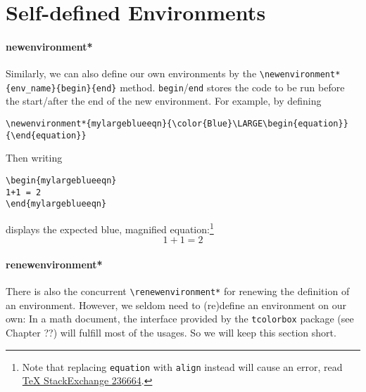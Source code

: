 \section{Self-defined Environments}

\paragraph{newenvironment*} Similarly, we can also define our own environments by the \texttt{\textbackslash newenvironment*\{env\_name\}\{begin\}\{end\}} method. \texttt{begin}/\texttt{end} stores the code to be run before the start/after the end of the new environment. For example, by defining
\begin{lstlisting}
\newenvironment*{mylargeblueeqn}{\color{Blue}\LARGE\begin{equation}}{\end{equation}}   
\end{lstlisting}
\newenvironment*{mylargeblueeqn}{\color{Blue}\LARGE\begin{equation}}{\end{equation}}   
Then writing
\begin{lstlisting}
\begin{mylargeblueeqn}
1+1 = 2
\end{mylargeblueeqn}    
\end{lstlisting}
displays the expected blue, magnified equation:\footnote{Note that replacing \texttt{equation} with \texttt{align} instead will cause an error, read \href{https://tex.stackexchange.com/questions/236664/newenvironment-error-with-beginalign-and-endalign}{\TeX{} StackExchange 236664}.}
\begin{mylargeblueeqn}
1+1 = 2
\end{mylargeblueeqn}

\paragraph{renewenvironment*} There is also the concurrent \texttt{\textbackslash renewenvironment*} for renewing the definition of an environment. However, we seldom need to (re)define an environment on our own: In a math document, the interface provided by the \texttt{tcolorbox} package (see Chapter ??) will fulfill most of the usages. So we will keep this section short.
